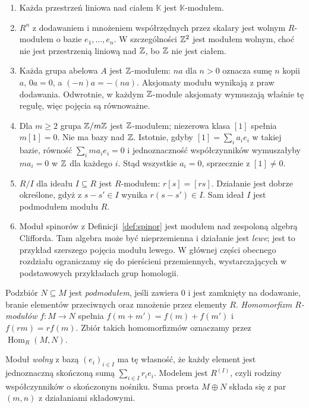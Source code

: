\begin{przyklad}
\label{prz:moduly-podstawowe}
\begin{enumerate}[leftmargin=*]
\item Każda przestrzeń liniowa nad ciałem
      $\mathbb K$ jest $\mathbb K$-modułem.
\item $R^n$ z dodawaniem i mnożeniem współrzędnych
      przez skalary jest wolnym $R$-modułem o bazie
      $e_1,\ldots,e_n$. W szczególności $\mathbb{Z}^2$
      jest modułem wolnym, choć nie jest przestrzenią
      liniową nad $\mathbb{Z}$, bo $\mathbb{Z}$ nie jest ciałem.
\item Każda grupa abelowa $A$ jest $\mathbb{Z}$-modułem:
      $na$ dla $n>0$ oznacza sumę $n$ kopii $a$,
      $0a=0$, a $(-n)a=-(na)$. Aksjomaty modułu
      wynikają z praw dodawania. Odwrotnie,
      w każdym $\mathbb{Z}$-module aksjomaty wymuszają
      właśnie tę regułę, więc pojęcia są równoważne.
\item Dla $m\geq2$ grupa $\mathbb{Z}/m\mathbb{Z}$ jest $\mathbb{Z}$-modułem;
      niezerowa klasa $[1]$ spełnia $m[1]=0$. Nie ma bazy
      nad $\mathbb{Z}$. Istotnie, gdyby $[1]=\sum_i a_i e_i$ w takiej
      bazie, równość $\sum_i ma_i e_i=0$ i jednoznaczność
      współczynników wymuszałyby $ma_i=0$ w $\mathbb{Z}$ dla każdego $i$.
      Stąd wszystkie $a_i=0$, sprzecznie z $[1]\ne0$.
\item $R/I$ dla ideału $I\subseteq R$ jest
      $R$-modułem: $r[s]=[rs]$. Działanie jest
      dobrze określone, gdyż z $s-s'\in I$
      wynika $r(s-s')\in I$.
      Sam ideał $I$ jest podmodułem modułu $R$.
\item Moduł spinorów z Definicji~\ref{def:spinor}
      jest modułem nad zespoloną algebrą
      Clifforda. Tam algebra może być
      nieprzemienna i działanie jest \emph{lewe};
      jest to przykład szerszego pojęcia modułu lewego.
      W głównej części obecnego rozdziału ograniczamy się
      do pierścieni przemiennych, wystarczających
      w podstawowych przykładach grup homologii.
\end{enumerate}
\end{przyklad}

\begin{definicja}
\label{def:modul-map}
Podzbiór $N\subseteq M$ jest \emph{podmodułem}, jeśli zawiera $0$
i jest zamknięty na dodawanie, branie elementów przeciwnych
oraz mnożenie przez elementy $R$.
\emph{Homomorfizm $R$-modułów} $f:M\to N$ spełnia
$f(m+m')=f(m)+f(m')$ i $f(rm)=rf(m)$.
Zbiór takich homomorfizmów oznaczamy przez $\operatorname{Hom}_R(M,N)$.

Moduł \emph{wolny} z bazą $(e_i)_{i\in I}$ ma tę własność,
że każdy element jest jednoznaczną skończoną sumą
$\sum_{i\in I}r_i e_i$. Modelem jest $R^{(I)}$, czyli rodziny
współczynników o skończonym nośniku. Suma prosta $M\oplus N$
składa się z par $(m,n)$ z działaniami składowymi.
\end{definicja}

